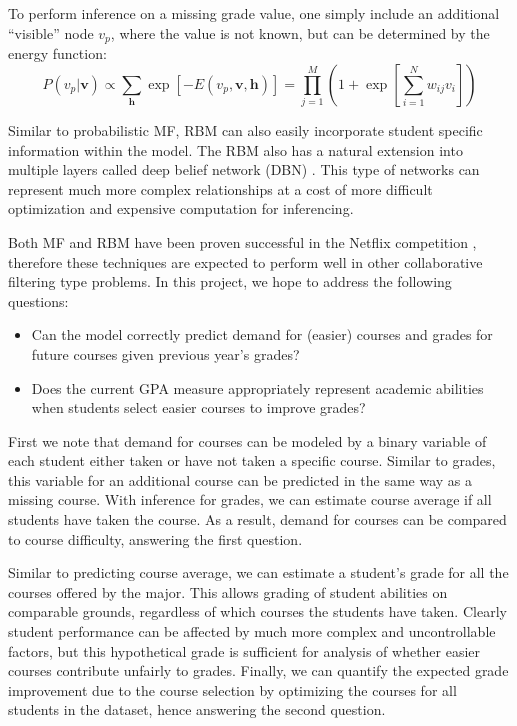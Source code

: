 \documentclass[12pt]{article}
\begin{document}
To perform inference on a missing grade value,
one simply include an additional ``visible'' node $v_p$,
where the value is not known, 
but can be determined by the energy function:
%
\begin{equation}
    P(v_p|\mathbf{v}) \propto
        \displaystyle\sum_{\mathbf{h}} 
        \exp[-E(v_p,\mathbf{v},\mathbf{h})]
    = \prod_{j=1}^M \left( 1 + 
        \exp\left[\sum_{i=1}^N w_{ij} v_i\right]
        \right)
\end{equation}

Similar to probabilistic MF, RBM can also easily incorporate
student specific information within the model.
The RBM also has a natural extension into multiple layers
called deep belief network (DBN) \cite{Sa09}.
This type of networks can represent much more complex 
relationships at a cost of more difficult optimization
and expensive computation for inferencing.

Both MF and RBM have been proven successful in 
the Netflix competition \cite{FeHeKh12}, 
therefore these techniques are expected to perform well 
in other collaborative filtering type problems.
In this project, we hope to address the following questions:
%
\begin{itemize} \itemsep0pt \parskip0pt
    \item Can the model correctly predict demand for (easier) courses
        and grades for future courses given previous year's grades?
    \item Does the current GPA measure appropriately represent
        academic abilities when students select easier courses to 
        improve grades?
\end{itemize}

First we note that demand for courses can be modeled by a binary variable
of each student either taken or have not taken a specific course.
Similar to grades, this variable for an additional course
can be predicted in the same way as a missing course.
With inference for grades, 
we can estimate course average if all students have taken the course.
As a result, 
demand for courses can be compared to course difficulty,
answering the first question.

Similar to predicting course average,
we can estimate a student's grade for all the courses offered by the major.
This allows grading of student abilities on comparable grounds,
regardless of which courses the students have taken.
Clearly student performance can be affected by much more
complex and uncontrollable factors,
but this hypothetical grade is sufficient for analysis of 
whether easier courses contribute unfairly to grades.
Finally, we can quantify the expected grade improvement 
due to the course selection by optimizing 
the courses for all students in the dataset,
hence answering the second question.
\end{document}
